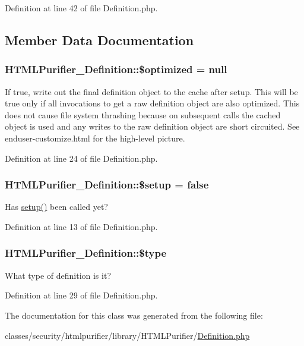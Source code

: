 Definition at line 42 of file Definition.\+php.



\subsection{Member Data Documentation}
\hypertarget{classHTMLPurifier__Definition_a3250fd885bfeeee52b9c92f093628dc0}{
\subsubsection[{\$optimized}]{\setlength{\rightskip}{0pt plus 5cm}H\+T\+M\+L\+Purifier\+\_\+\+Definition\+::\$optimized = null}}\label{classHTMLPurifier__Definition_a3250fd885bfeeee52b9c92f093628dc0}
If true, write out the final definition object to the cache after setup. This will be true only if all invocations to get a raw definition object are also optimized. This does not cause file system thrashing because on subsequent calls the cached object is used and any writes to the raw definition object are short circuited. See enduser-\/customize.\+html for the high-\/level picture. 

Definition at line 24 of file Definition.\+php.

\hypertarget{classHTMLPurifier__Definition_a8770f38b390d596bb5611c517e0710b3}{
\subsubsection[{\$setup}]{\setlength{\rightskip}{0pt plus 5cm}H\+T\+M\+L\+Purifier\+\_\+\+Definition\+::\$setup = false}}\label{classHTMLPurifier__Definition_a8770f38b390d596bb5611c517e0710b3}
Has \hyperlink{classHTMLPurifier__Definition_aa3b7b8592a5aa6341d4b6d32aef21fd1}{setup()} been called yet? 

Definition at line 13 of file Definition.\+php.

\hypertarget{classHTMLPurifier__Definition_a2e14e97d237d70cb1b22379e99e7100e}{
\subsubsection[{\$type}]{\setlength{\rightskip}{0pt plus 5cm}H\+T\+M\+L\+Purifier\+\_\+\+Definition\+::\$type}}\label{classHTMLPurifier__Definition_a2e14e97d237d70cb1b22379e99e7100e}
What type of definition is it? 

Definition at line 29 of file Definition.\+php.



The documentation for this class was generated from the following file\+:\begin{DoxyCompactItemize}
\item 
classes/security/htmlpurifier/library/\+H\+T\+M\+L\+Purifier/\hyperlink{Definition_8php}{Definition.\+php}\end{DoxyCompactItemize}
